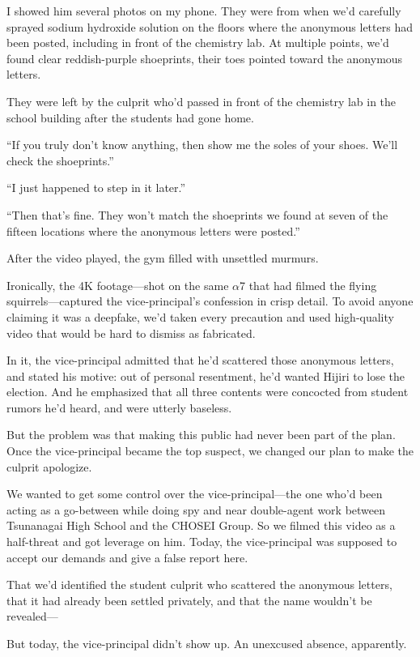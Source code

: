 \documentclass[
    a4paper,
    12pt,
    twoside,
    openany,
    UTF8,
    fontset=windows
]{ctexbook}
\begin{document}
I showed him several photos on my phone. They were from when we'd carefully sprayed sodium hydroxide solution on the floors where the anonymous letters had been posted, including in front of the chemistry lab. At multiple points, we'd found clear reddish-purple shoeprints, their toes pointed toward the anonymous letters.

They were left by the culprit who'd passed in front of the chemistry lab in the school building after the students had gone home.

``If you truly don't know anything, then show me the soles of your shoes. We'll check the shoeprints.''

``I just happened to step in it later.''

``Then that's fine. They won't match the shoeprints we found at seven of the fifteen locations where the anonymous letters were posted.''

After the video played, the gym filled with unsettled murmurs.

Ironically, the 4K footage---shot on the same $\alpha$7 that had filmed the flying squirrels---captured the vice-principal's confession in crisp detail. To avoid anyone claiming it was a deepfake, we'd taken every precaution and used high-quality video that would be hard to dismiss as fabricated.

In it, the vice-principal admitted that he'd scattered those anonymous letters, and stated his motive: out of personal resentment, he'd wanted Hijiri to lose the election. And he emphasized that all three contents were concocted from student rumors he'd heard, and were utterly baseless.

But the problem was that making this public had never been part of the plan.
Once the vice-principal became the top suspect, we changed our plan to make the culprit apologize.

We wanted to get some control over the vice-principal---the one who'd been acting as a go-between while doing spy and near double-agent work between Tsunanagai High School and the CHOSEI Group. So we filmed this video as a half-threat and got leverage on him. Today, the vice-principal was supposed to accept our demands and give a false report here.

That we'd identified the student culprit who scattered the anonymous letters, that it had already been settled privately, and that the name wouldn't be revealed---

But today, the vice-principal didn't show up. An unexcused absence, apparently.
\end{document}
